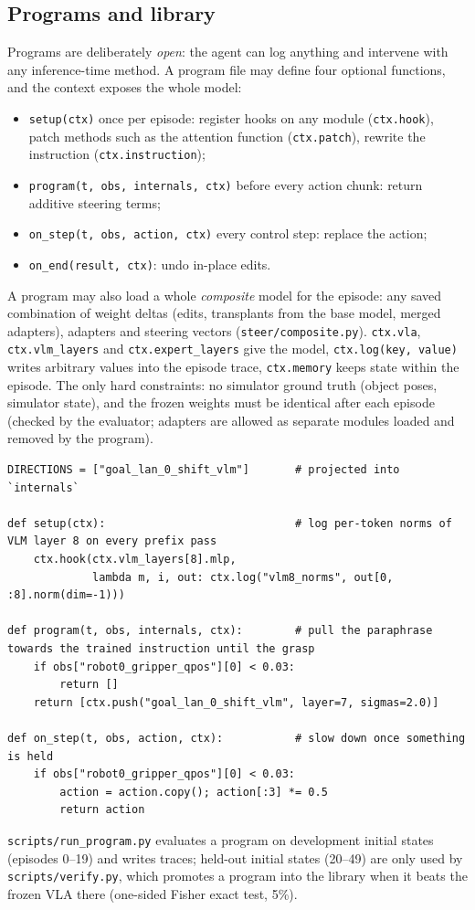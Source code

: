 \documentclass[11pt]{article}
\begin{document}
\subsection{Programs and library}
Programs are deliberately \emph{open}: the agent can log anything and intervene with any inference-time method. A program
file may define four optional functions, and the context exposes the whole model:
\begin{itemize}
\item \texttt{setup(ctx)} once per episode: register hooks on any module (\texttt{ctx.hook}), patch methods such as the
attention function (\texttt{ctx.patch}), rewrite the instruction (\texttt{ctx.instruction});
\item \texttt{program(t, obs, internals, ctx)} before every action chunk: return additive steering terms;
\item \texttt{on\_step(t, obs, action, ctx)} every control step: replace the action;
\item \texttt{on\_end(result, ctx)}: undo in-place edits.
\end{itemize}
A program may also load a whole \emph{composite} model for the episode: any saved combination of weight deltas (edits, transplants from the base model, merged adapters), adapters and steering vectors (\texttt{steer/composite.py}). \texttt{ctx.vla}, \texttt{ctx.vlm\_layers} and \texttt{ctx.expert\_layers} give the model, \texttt{ctx.log(key, value)} writes
arbitrary values into the episode trace, \texttt{ctx.memory} keeps state within the episode. The only hard constraints:
no simulator ground truth (object poses, simulator state), and the frozen weights must be identical after each episode
(checked by the evaluator; adapters are allowed as separate modules loaded and removed by the program).
\begin{lstlisting}
DIRECTIONS = ["goal_lan_0_shift_vlm"]       # projected into `internals`

def setup(ctx):                             # log per-token norms of VLM layer 8 on every prefix pass
    ctx.hook(ctx.vlm_layers[8].mlp,
             lambda m, i, out: ctx.log("vlm8_norms", out[0, :8].norm(dim=-1)))

def program(t, obs, internals, ctx):        # pull the paraphrase towards the trained instruction until the grasp
    if obs["robot0_gripper_qpos"][0] < 0.03:
        return []
    return [ctx.push("goal_lan_0_shift_vlm", layer=7, sigmas=2.0)]

def on_step(t, obs, action, ctx):           # slow down once something is held
    if obs["robot0_gripper_qpos"][0] < 0.03:
        action = action.copy(); action[:3] *= 0.5
        return action
\end{lstlisting}
\texttt{scripts/run\_program.py} evaluates a program on development initial states (episodes 0--19) and writes traces;
held-out initial states (20--49) are only used by \texttt{scripts/verify.py}, which promotes a program into the library when it
beats the frozen VLA there (one-sided Fisher exact test, 5\%).
\end{document}
